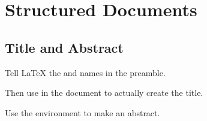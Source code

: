 \documentclass[aspectratio=169]{beamer}
\begin{document}

\section{Structured Documents}



























\subsection{Title and Abstract}
\begin{frame}[fragile]{\insertsubsection}
\begin{itemize}{\small
\item Tell \LaTeX{} the  and  names in the preamble.
\item Then use  in the document to actually create the title.
\item Use the  environment to make an abstract.
}\end{itemize}
\end{frame}

\end{document}
